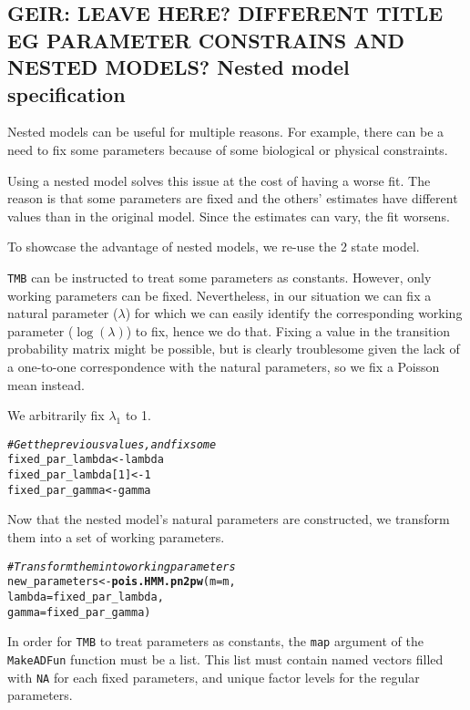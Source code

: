 \documentclass[bimj,fleqn]{w-art}\usepackage[]{graphicx}\usepackage[]{color}
\makeatletter
\newcommand{\hlnum}[1]{\textcolor[rgb]{0.686,0.059,0.569}{#1}}%
\newcommand{\hlcom}[1]{\textcolor[rgb]{0.678,0.584,0.686}{\textit{#1}}}%
\newcommand{\hlstd}[1]{\textcolor[rgb]{0.345,0.345,0.345}{#1}}%
\newcommand{\hlkwb}[1]{\textcolor[rgb]{0.69,0.353,0.396}{#1}}%
\newcommand{\hlkwc}[1]{\textcolor[rgb]{0.333,0.667,0.333}{#1}}%
\newcommand{\hlkwd}[1]{\textcolor[rgb]{0.737,0.353,0.396}{\textbf{#1}}}%
\newenvironment{kframe}{%
 \def\at@end@of@kframe{}%
 \ifinner\ifhmode%
  \def\at@end@of@kframe{\end{minipage}}%
  \begin{minipage}{\columnwidth}%
 \fi\fi%
 \def\FrameCommand##1{\hskip\@totalleftmargin \hskip-\fboxsep
 \colorbox{shadecolor}{##1}\hskip-\fboxsep
     \hskip-\linewidth \hskip-\@totalleftmargin \hskip\columnwidth}%
 \MakeFramed {\advance\hsize-\width
   \@totalleftmargin\z@ \linewidth\hsize
   \@setminipage}}%
 {\par\unskip\endMakeFramed%
 \at@end@of@kframe}
\newenvironment{knitrout}{}{} %
\theoremstyle{plain}
\theoremstyle{definition}
\makeatother
\begin{document}
\subsection{GEIR: LEAVE HERE? DIFFERENT TITLE EG PARAMETER CONSTRAINS AND NESTED MODELS? Nested model specification}
\label{sec:nested}

Nested models can be useful for multiple reasons.
For example, there can be a need to fix some parameters because of some biological or physical constraints.

Using a nested model solves this issue at the cost of having a worse fit.
The reason is that some parameters are fixed and the others' estimates have different values than in the original model.
Since the estimates can vary, the fit worsens.

To showcase the advantage of nested models, we re-use the 2 state model.

{\tt{TMB}} can be instructed to treat some parameters as constants.
However, only working parameters can be fixed.
Nevertheless, in our situation we can fix a natural parameter ($\lambda$) for which we can easily identify the corresponding working parameter ($\log(\lambda)$) to fix, hence we do that.
Fixing a value in the transition probability matrix might be possible, but is clearly troublesome given the lack of a one-to-one correspondence with the natural parameters, so we fix a Poisson mean instead.

We arbitrarily fix $\lambda_1$ to 1.
\begin{knitrout}
\color{fgcolor}\begin{kframe}
\begin{alltt}
\hlcom{# Get the previous values, and fix some}
\hlstd{fixed_par_lambda} \hlkwb{<-} \hlstd{lambda}
\hlstd{fixed_par_lambda[}\hlnum{1}\hlstd{]} \hlkwb{<-} \hlnum{1}
\hlstd{fixed_par_gamma} \hlkwb{<-} \hlstd{gamma}
\end{alltt}
\end{kframe}
\end{knitrout}

Now that the nested model's natural parameters are constructed, we transform them into a set of working parameters.
\begin{knitrout}
\color{fgcolor}\begin{kframe}
\begin{alltt}
\hlcom{# Transform them into working parameters}
\hlstd{new_parameters} \hlkwb{<-} \hlkwd{pois.HMM.pn2pw}\hlstd{(}\hlkwc{m} \hlstd{= m,}
                                 \hlkwc{lambda} \hlstd{= fixed_par_lambda,}
                                 \hlkwc{gamma} \hlstd{= fixed_par_gamma)}
\end{alltt}
\end{kframe}
\end{knitrout}
In order for {\tt{TMB}} to treat parameters as constants, the \texttt{map} argument of the \texttt{MakeADFun} function must be a list.
This list must contain named vectors filled with \texttt{NA} for each fixed parameters, and unique factor levels for the regular parameters.
\end{document}
